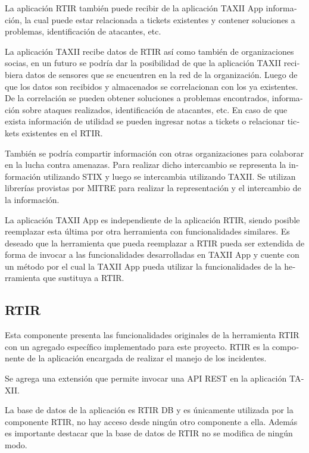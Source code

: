 \documentclass[11pt]{article}
\begin{document}
\foreignlanguage{spanish}{La aplicación RTIR también puede recibir de la aplicación TAXII App información, la cual puede
estar relacionada a tickets existentes y contener soluciones a problemas, identificación de atacantes, etc.}


\bigskip

\foreignlanguage{spanish}{La aplicación TAXII recibe datos de RTIR así como también de organizaciones socias, en un
futuro se podría dar la posibilidad de que la aplicación TAXII recibiera datos de sensores que se encuentren en la red
de la organización. Luego de que los datos son recibidos y almacenados se correlacionan con los ya existentes. De la
correlación se pueden obtener soluciones a problemas encontrados, información sobre ataques realizados, identificación
de atacantes, etc. En caso de que exista información de utilidad se pueden ingresar notas a tickets o relacionar
tickets existentes en el RTIR.}

\foreignlanguage{spanish}{También se podría compartir información con otras organizaciones para colaborar en la lucha
contra amenazas. Para realizar dicho intercambio se representa la información utilizando STIX y luego se intercambia
utilizando TAXII. Se utilizan librerías provistas por MITRE para realizar la representación y el intercambio de la
información.}


\bigskip

\foreignlanguage{spanish}{La aplicación TAXII App es independiente de la aplicación RTIR, siendo posible reemplazar esta
última por otra herramienta con funcionalidades similares. Es deseado que la herramienta que pueda reemplazar a RTIR
pueda ser extendida de forma de invocar a las funcionalidades desarrolladas en TAXII App y cuente con un método por el
cual la TAXII App pueda utilizar la funcionalidades de la herramienta que sustituya a RTIR.}

\subsection[RTIR]{\foreignlanguage{spanish}{RTIR}}
\foreignlanguage{spanish}{Esta componente presenta las funcionalidades originales de la herramienta RTIR con un agregado
específico implementado para este proyecto. RTIR es la componente de la aplicación encargada de realizar el manejo de
los incidentes.}

\foreignlanguage{spanish}{Se agrega una extensión que permite invocar una API REST en la aplicación TAXII. \ }

\foreignlanguage{spanish}{La base de datos de la aplicación es RTIR DB y es únicamente utilizada por la componente RTIR,
no hay acceso desde ningún otro componente a ella. Además es importante destacar que la base de datos de RTIR no se
modifica de ningún modo.}
\end{document}
